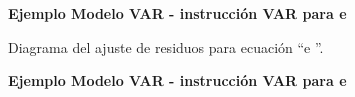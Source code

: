 \begin{figure}[H]
		\centering
		\textbf{Ejemplo Modelo VAR - instrucci\'on VAR para e}\par\medskip
		\caption{Diagrama del ajuste de residuos para ecuación  \textquotedblleft e \textquotedblright.}\label{fig52}
\end{figure}
	
	
	\begin{figure}[H]\label{figd26}
		\centering
		\textbf{Ejemplo Modelo VAR - instrucci\'on VAR para e}\par\medskip
	\end{figure}
	
